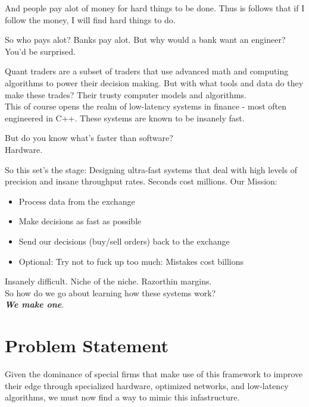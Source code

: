 \documentclass[12pt]{article}
\begin{document}
And people pay alot of money for hard things to be done. Thus is follows that if I follow the money, I will find hard things to do.

So who pays alot? Banks pay alot.
But why would a bank want an engineer?
You'd be surprised.

Quant traders are a subset of traders that use advanced math and computing algorithms to power their decision making.
But with what tools and data do they make these trades? Their trusty computer models and algorithms.
\\ This of course opens the realm of low-latency systems in finance - most often engineered in C++.
These systems are known to be insanely fast.

But do you know what's faster than software? \\ Hardware.

So this set's the stage: Designing ultra-fast systems that deal with high levels of precision and insane throughput rates.
Seconds cost millions. 
\newline
Our Mission: 
\begin{itemize}
  \item Process data from the exchange
  \item Make decisions as fast as possible
  \item Send our decisions (buy/sell orders) back to the exchange
  \item Optional: Try not to fuck up too much: Mistakes cost billions 
\end{itemize}

Insanely difficult.
Niche of the niche.
Razorthin margins.
\\ So how do we go about learning how these systems work? 
\newline
\\ \textbf{\emph{We make one}}.

\clearpage


\section*{Problem Statement}

Given the dominance of special firms that make use of this framework to improve their edge through specialized hardware, optimized networks, and low-latency algorithms, we must now find a way to mimic this infastructure. 
\end{document}
